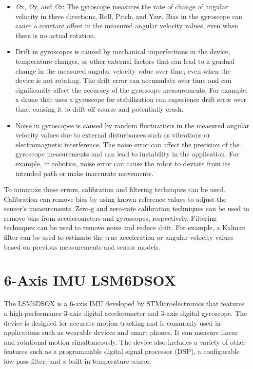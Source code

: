 \begin{itemize}
	\item $\Omega$x, $\Omega$y, and $\Omega$z: The gyroscope measures the rate of change of angular velocity in three directions, Roll, Pitch, and Yaw. Bias in the gyroscope can cause a constant offset in the measured angular velocity values, even when there is no actual rotation. \cite{Noureldin:2013}
	\item Drift in gyroscopes is caused by mechanical imperfections in the device, temperature changes, or other external factors that can lead to a gradual change in the measured angular velocity value over time, even when the device is not rotating. The drift error can accumulate over time and can significantly affect the accuracy of the gyroscope measurements. For example, a drone that uses a gyroscope for stabilization can experience drift error over time, causing it to drift off course and potentially crash.
	\item Noise in gyroscopes is caused by random fluctuations in the measured angular velocity values due to external disturbances such as vibrations or electromagnetic interference. The noise error can affect the precision of the gyroscope measurements and can lead to instability in the application. For example, in robotics, noise error can cause the robot to deviate from its intended path or make inaccurate movements.
\end{itemize}

To minimize these errors, calibration and filtering techniques can be used. Calibration can remove bias by using known reference values to adjust the sensor's measurements. Zero-g and zero-rate calibration techniques can be used to remove bias from accelerometers and gyroscopes, respectively. Filtering techniques can be used to remove noise and reduce drift. For example, a Kalman filter can be used to estimate the true acceleration or angular velocity values based on previous measurements and sensor models.\cite{Lin:2005}


\section{6-Axis IMU LSM6DSOX}

The LSM6DSOX is a 6-axis IMU developed by STMicroelectronics that features a high-performance 3-axis digital accelerometer and 3-axis digital gyroscope. The device is designed for accurate motion tracking and is commonly used in applications such as wearable devices and smart phones. It can measure linear and rotational motion simultaneously.\cite{STMicroelectronics:2018} The device also includes a variety of other features such as a programmable digital signal processor (DSP), a configurable low-pass filter, and a built-in temperature sensor.

